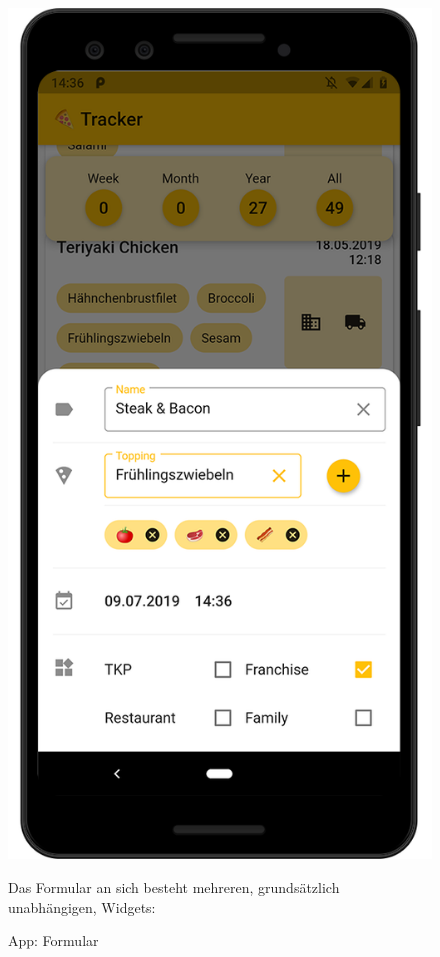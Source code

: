 \begin{figure}[H]
    \vspace{0pt}
        \includegraphics[width=\linewidth]{pixel-3_mockup-2--form}
        \caption{
            App: Formular
        }
    \endminipage\hfill
    \vspace{0pt}
        Das Formular an sich besteht mehreren, grundsätzlich
        unabhängigen, Widgets:


\end{figure}
